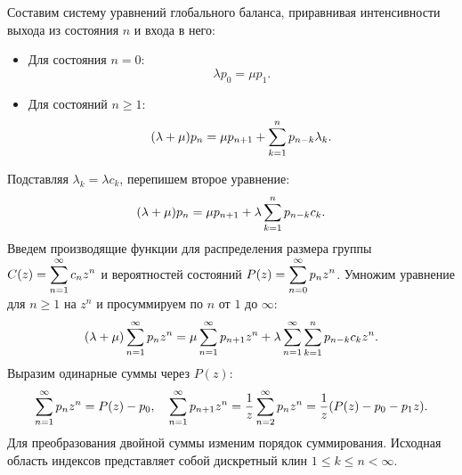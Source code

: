 \begin{sproof}
Составим систему уравнений глобального баланса, приравнивая интенсивности выхода из состояния $n$ и входа в него:
\begin{itemize}
    \item Для состояния $n = 0$:
    $$ \lambda p_0 = \mu p_1. $$
    \item Для состояний $n \ge 1$:
    $$ (\lambda + \mu) p_n = \mu p_{n+1} + \displaystyle \sum_{k=1}^{n} p_{n-k} \lambda_k. $$
\end{itemize}
Подставляя $\lambda_k = \lambda c_k$, перепишем второе уравнение:
$$ (\lambda + \mu) p_n = \mu p_{n+1} + \lambda \displaystyle \sum_{k=1}^{n} p_{n-k} c_k. $$
Введем производящие функции для распределения размера группы $C(z) = \displaystyle \sum_{n=1}^{\infty} c_n z^n$ и вероятностей состояний $P(z) = \displaystyle \sum_{n=0}^{\infty} p_n z^n$. Умножим уравнение для $n \ge 1$ на $z^n$ и просуммируем по $n$ от $1$ до $\infty$:
$$ (\lambda + \mu) \displaystyle \sum_{n=1}^{\infty} p_n z^n = \mu \displaystyle \sum_{n=1}^{\infty} p_{n+1} z^n + \lambda \displaystyle \sum_{n=1}^{\infty} \displaystyle \sum_{k=1}^{n} p_{n-k} c_k z^n. $$
Выразим одинарные суммы через $P(z)$:
$$ \displaystyle \sum_{n=1}^{\infty} p_n z^n = P(z) - p_0, \quad \displaystyle \sum_{n=1}^{\infty} p_{n+1} z^n = \frac{1}{z} \displaystyle \sum_{n=2}^{\infty} p_n z^n = \frac{1}{z} (P(z) - p_0 - p_1 z). $$
Для преобразования двойной суммы изменим порядок суммирования. Исходная область индексов представляет собой дискретный клин $1 \le k \le n < \infty$.

\begin{center}
\end{center}


\end{sproof}
